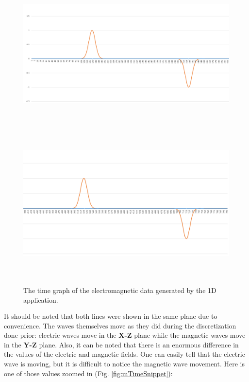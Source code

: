 \begin{figure}[h!]
	\centering
	\includegraphics[height= 8cm,width=\textwidth]{Figures/1DtimeGraph1}\\
	\includegraphics[height= 8cm,width=\textwidth]{Figures/1DtimeGraph2}
	\decoRule
	\caption[1D Electromagnetic Time Graph]{The time graph of the electromagnetic data generated by the 1D application.}
	\label{fig:emTimeGraph}
\end{figure}

\clearpage

It should be noted that both lines were shown in the same plane due to convenience. The waves themselves move as they did during the discretization done prior: electric waves move in the \textbf{X-Z} plane while the magnetic waves move in the \textbf{Y-Z} plane. Also, it can be noted that there is an enormous difference in the values of the electric and magnetic fields. One can easily tell that the electric wave is moving, but it is difficult to notice the magnetic wave movement. Here is one of those values zoomed in (Fig. \ref{fig:mTimeSnippet}):

